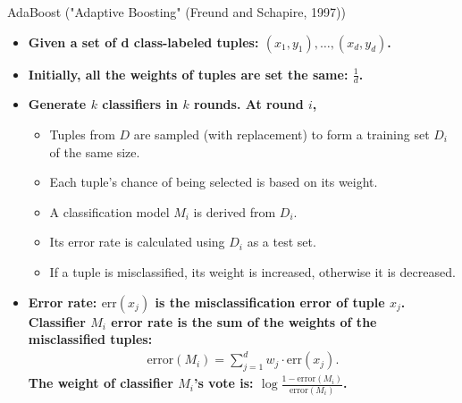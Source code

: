 \begin{frame}{AdaBoost ("Adaptive Boosting" (Freund and Schapire, 1997))}
	\begin{itemize}
		\item \textbf{Given a set of d class-labeled tuples: $(x_1 , y_1), \ldots, (x_d, y_d)$.}
		\item \textbf{Initially, all the weights of tuples are set the same: $\frac{1}{d}$.}
		\item \textbf{Generate $k$ classifiers in $k$ rounds. At round $i$,}
		      \begin{itemize}
			      \item Tuples from $D$ are sampled (with replacement) to form a training set $D_i$ of the same size.
			      \item Each tuple's chance of being selected is based on its weight.
			      \item A classification model $M_i$ is derived from $D_i$.
			      \item Its error rate is calculated using $D_i$ as a test set.
			      \item If a tuple is misclassified, its weight is increased, otherwise it is decreased.
		      \end{itemize}
		\item \textbf{Error rate: $\text{err}(x_j)$ is the misclassification error of tuple $x_j$. Classifier $M_i$ error rate is the sum of the weights of the misclassified tuples:}
		      \begin{align}
			      \text{error}(M_i) = \sum_{j=1}^{d} w_j \cdot \text{err}(x_j).
		      \end{align}
		      \textbf{The weight of classifier $M_i$'s vote is: $\log \frac{1-\text{error}(M_i)}{\text{error}(M_i)}$.}
	\end{itemize}
\end{frame}

